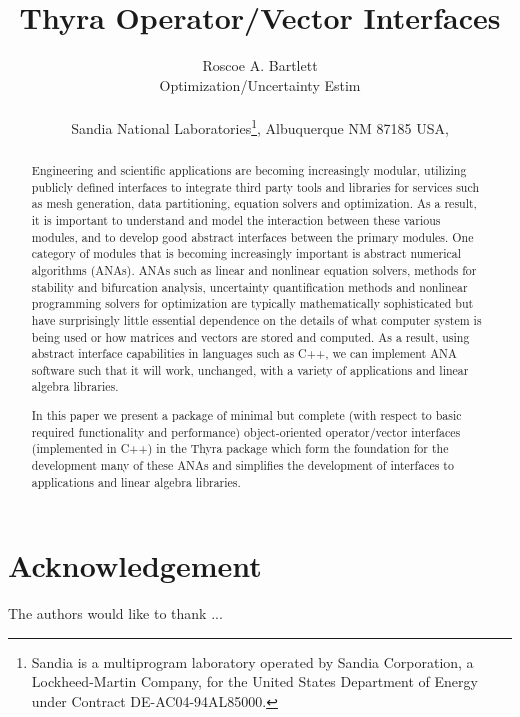\documentclass[pdf,ps2pdf,11pt]{SANDreport}
\title{
Thyra Operator/Vector Interfaces }
\author{
Roscoe A. Bartlett \\ Optimization/Uncertainty Estim \\ \\
Sandia National Laboratories\footnote{
Sandia is a multiprogram laboratory operated by Sandia Corporation, a
Lockheed-Martin Company, for the United States Department of Energy
under Contract DE-AC04-94AL85000.}, Albuquerque NM 87185 USA, \\
}
\date{}
\begin{document}
\maketitle

%

%
\begin{abstract}
%
Engineering and scientific applications are becoming increasingly modular,
utilizing publicly defined interfaces to integrate third party tools and
libraries for services such as mesh generation, data partitioning, equation
solvers and optimization.  As a result, it is important to understand and
model the interaction between these various modules, and to develop good
abstract interfaces between the primary modules.  One category of modules that
is becoming increasingly important is abstract numerical algorithms (ANAs).
ANAs such as linear and nonlinear equation solvers, methods for stability and
bifurcation analysis, uncertainty quantification methods and nonlinear
programming solvers for optimization are typically mathematically
sophisticated but have surprisingly little essential dependence on the details
of what computer system is being used or how matrices and vectors are stored
and computed.  As a result, using abstract interface capabilities in languages
such as C++, we can implement ANA software such that it will work, unchanged,
with a variety of applications and linear algebra libraries.

In this paper we present a package of minimal but complete (with respect to
basic required functionality and performance) object-oriented operator/vector
interfaces (implemented in C++) in the Thyra package which form the foundation
for the development many of these ANAs and simplifies the development of
interfaces to applications and linear algebra libraries.
%
\end{abstract}
%

%
\clearpage
\section*{Acknowledgement}
The authors would like to thank ...
\end{document}
